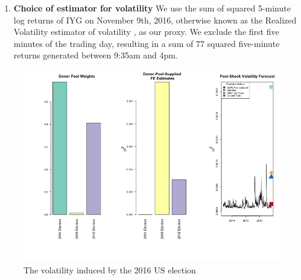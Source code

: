 \documentclass[11pt]{article}
\theoremstyle{definition}
\begin{document}
\begin{enumerate}
    \item \textbf{Choice of estimator for volatility} We use the sum of squared 5-minute log returns of IYG on November 9th, 2016, otherwise known as the Realized Volatility estimator of volatility \citep{andersen2008realized}, as our proxy.  We exclude the first five minutes of the trading day, resulting in a sum of 77 squared five-minute returns generated between 9:35am and 4pm.
\end{enumerate} 

\begin{figure}[H]
\begin{center}
  \includegraphics[scale=.5]{real_data_output_plots/savetime_SatMay112045002024_IYG_CL=F-^VIX-^IRX-^FVX-^TNX-^TYX_^VIX_2016-11-08-2004-11-02-2008-11-04-2012-11-06.png}
  \caption{The volatility induced by the 2016 US election}
  \label{fig:SVF_2016}
  \end{center}
\end{figure}
\end{document}
